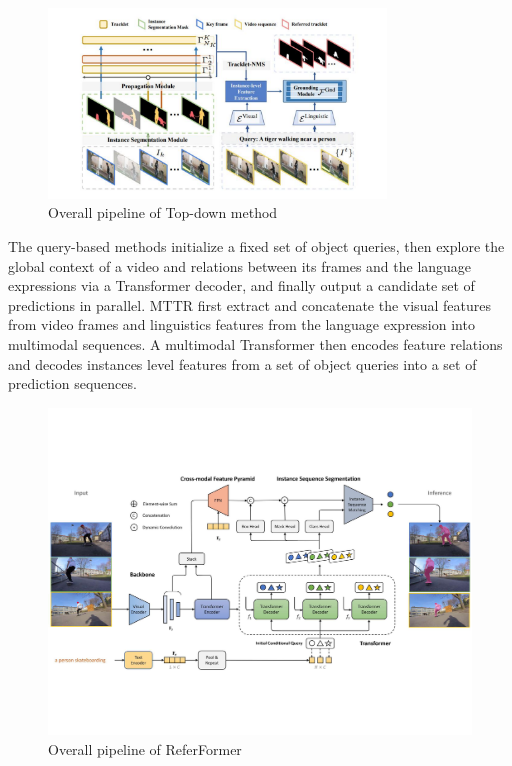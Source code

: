 \begin{figure}
    \centering
    \includegraphics[width=0.8\textwidth]{content/resources/images/TopDown.pdf}
    \caption{Overall pipeline of Top-down method \cite{liang_rethinking_2021} }
    \label{fig:top_down}
\end{figure}

The query-based methods initialize a fixed set of object queries, then explore the global context of a video and relations between its frames and the language expressions via a Transformer decoder, and finally output a candidate set of predictions in parallel. MTTR\cite{botach_end--end_2022} first extract and concatenate the visual features from video frames and linguistics features from the language expression into multimodal sequences. A multimodal Transformer then encodes feature relations and decodes instances level features from a set of object queries into a set of prediction sequences. 


\begin{figure}[ht]
    \centering
    \includegraphics[width=\textwidth]{content/resources/images/ReferFormer.pdf}
    \caption{Overall pipeline of ReferFormer \cite{wu_language_2022} }
    \label{fig:referformer}
\end{figure}

